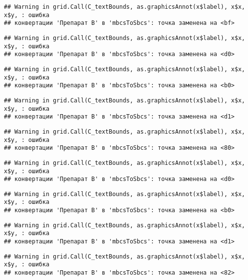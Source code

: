 \documentclass[
]{article}
\begin{document}
\begin{verbatim}
## Warning in grid.Call(C_textBounds, as.graphicsAnnot(x$label), x$x, x$y, : ошибка
## конвертации 'Препарат B' в 'mbcsToSbcs': точка заменена на <bf>
\end{verbatim}

\begin{verbatim}
## Warning in grid.Call(C_textBounds, as.graphicsAnnot(x$label), x$x, x$y, : ошибка
## конвертации 'Препарат B' в 'mbcsToSbcs': точка заменена на <d0>
\end{verbatim}

\begin{verbatim}
## Warning in grid.Call(C_textBounds, as.graphicsAnnot(x$label), x$x, x$y, : ошибка
## конвертации 'Препарат B' в 'mbcsToSbcs': точка заменена на <b0>
\end{verbatim}

\begin{verbatim}
## Warning in grid.Call(C_textBounds, as.graphicsAnnot(x$label), x$x, x$y, : ошибка
## конвертации 'Препарат B' в 'mbcsToSbcs': точка заменена на <d1>
\end{verbatim}

\begin{verbatim}
## Warning in grid.Call(C_textBounds, as.graphicsAnnot(x$label), x$x, x$y, : ошибка
## конвертации 'Препарат B' в 'mbcsToSbcs': точка заменена на <80>
\end{verbatim}

\begin{verbatim}
## Warning in grid.Call(C_textBounds, as.graphicsAnnot(x$label), x$x, x$y, : ошибка
## конвертации 'Препарат B' в 'mbcsToSbcs': точка заменена на <d0>
\end{verbatim}

\begin{verbatim}
## Warning in grid.Call(C_textBounds, as.graphicsAnnot(x$label), x$x, x$y, : ошибка
## конвертации 'Препарат B' в 'mbcsToSbcs': точка заменена на <b0>
\end{verbatim}

\begin{verbatim}
## Warning in grid.Call(C_textBounds, as.graphicsAnnot(x$label), x$x, x$y, : ошибка
## конвертации 'Препарат B' в 'mbcsToSbcs': точка заменена на <d1>
\end{verbatim}

\begin{verbatim}
## Warning in grid.Call(C_textBounds, as.graphicsAnnot(x$label), x$x, x$y, : ошибка
## конвертации 'Препарат B' в 'mbcsToSbcs': точка заменена на <82>
\end{verbatim}
\end{document}
